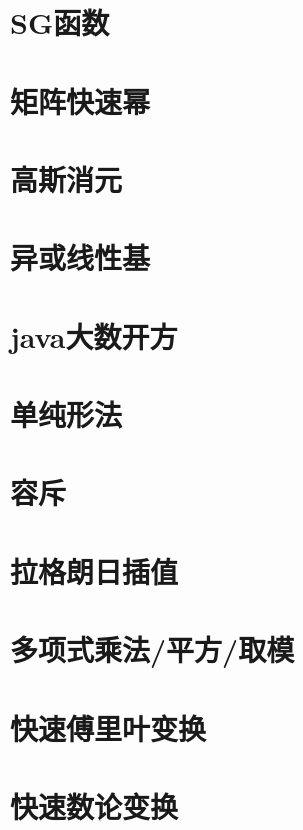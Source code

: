 \section{SG函数}
\raggedbottom
\hrulefill
\section{矩阵快速幂}
\raggedbottom
\hrulefill
\section{高斯消元}
\raggedbottom
\hrulefill
\section{异或线性基}
\raggedbottom
\hrulefill
\section{java大数开方}
\raggedbottom
\hrulefill
\section{单纯形法}
\raggedbottom
\hrulefill
\section{容斥}
\raggedbottom
\hrulefill
\section{拉格朗日插值}
\raggedbottom
\hrulefill
\section{多项式乘法/平方/取模}
\raggedbottom
\hrulefill
\section{快速傅里叶变换}
\raggedbottom
\hrulefill
\section{快速数论变换}
\raggedbottom
\hrulefill
